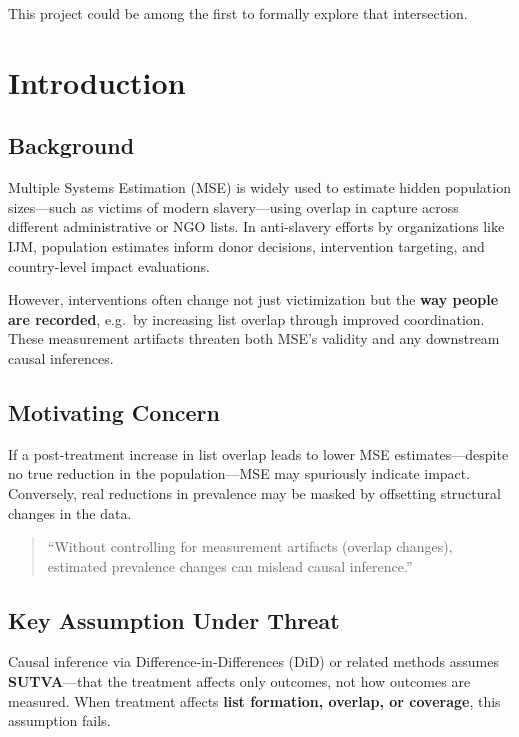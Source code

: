 \documentclass[
  12pt,
]{article}
\theoremstyle{plain}
\theoremstyle{definition}
\begin{document}
This project could be among the first to formally explore that
intersection.

\newpage

\section{Introduction}\label{introduction}

\subsection{Background}\label{background}

Multiple Systems Estimation (MSE) is widely used to estimate hidden
population sizes---such as victims of modern slavery---using overlap in
capture across different administrative or NGO lists. In anti-slavery
efforts by organizations like IJM, population estimates inform donor
decisions, intervention targeting, and country-level impact evaluations.

However, interventions often change not just victimization but the
\textbf{way people are recorded}, e.g.~by increasing list overlap
through improved coordination. These measurement artifacts threaten both
MSE's validity and any downstream causal inferences.

\subsection{Motivating Concern}\label{motivating-concern}

If a post-treatment increase in list overlap leads to lower MSE
estimates---despite no true reduction in the population---MSE may
spuriously indicate impact. Conversely, real reductions in prevalence
may be masked by offsetting structural changes in the data.

\begin{quote}
``Without controlling for measurement artifacts (overlap changes),
estimated prevalence changes can mislead causal inference.''
\end{quote}

\subsection{Key Assumption Under
Threat}\label{key-assumption-under-threat}

Causal inference via Difference-in-Differences (DiD) or related methods
assumes \textbf{SUTVA}---that the treatment affects only outcomes, not
how outcomes are measured. When treatment affects \textbf{list
formation, overlap, or coverage}, this assumption fails.
\end{document}
